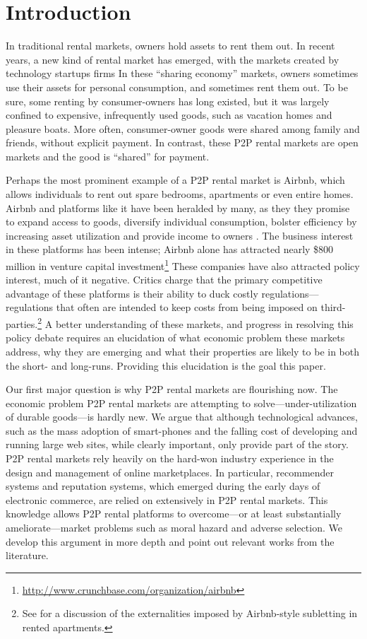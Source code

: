 \documentclass[11pt]{article}
\begin{document}
\section{Introduction}
In traditional rental markets, owners hold assets to rent them out.
In recent years, a new kind of rental market has emerged, with the markets created by technology startups firms 
In these ``sharing economy'' markets, owners sometimes use their assets for personal consumption, and sometimes rent them out.
To be sure, some renting by consumer-owners has long existed, but it was largely confined to expensive, infrequently used goods, such as vacation homes and pleasure boats.
More often, consumer-owner goods were shared among family and friends, without explicit payment.
In contrast, these P2P rental markets are open markets and the good is ``shared'' for payment. 

Perhaps the most prominent example of a P2P rental market is Airbnb, which allows individuals to rent out spare bedrooms, apartments or even entire homes. 
Airbnb and platforms like it have been heralded by many, as they they promise to expand access to goods, diversify individual consumption, bolster efficiency by increasing asset utilization and provide income to owners \citep{sundararajan2013zipcar}.
The business interest in these platforms has been intense; Airbnb alone has attracted nearly \$800 million in venture capital investment\footnote{\href{http://www.crunchbase.com/organization/airbnb}{http://www.crunchbase.com/organization/airbnb}}
These companies have also attracted policy interest, much of it negative. 
Critics charge that the primary competitive advantage of these platforms is their ability to duck costly regulations---regulations that often are intended to keep costs from being imposed on third-parties.\footnote{
  See \cite{horton2014tragedy} for a discussion of the externalities imposed by Airbnb-style subletting in rented apartments.
}   
A better understanding of these markets, and progress in resolving this policy debate requires an elucidation of what economic problem these markets address, why they are emerging and what their properties are likely to be in both the short- and long-runs. 
Providing this elucidation is the goal this paper. 

Our first major question is why P2P rental markets are flourishing now.
The economic problem P2P rental markets are attempting to solve---under-utilization of durable goods---is hardly new.  
We argue that although technological advances, such as the mass adoption of smart-phones and the falling cost of developing and running large web sites, while clearly important, only provide part of the story. 
P2P rental markets rely heavily on the hard-won industry experience in the design and management of online marketplaces.
In particular, recommender systems and reputation systems, which emerged during the early days of electronic commerce, are relied on extensively in P2P rental markets.  
This knowledge allows P2P rental platforms to overcome---or at least substantially ameliorate---market problems such as moral hazard and adverse selection.  
We develop this argument in more depth and point out relevant works from the literature. 
\end{document}
